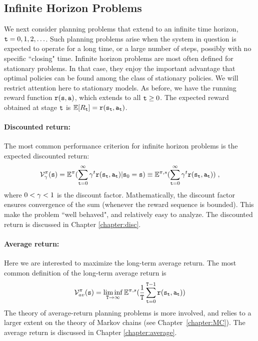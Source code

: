 \subsection{Infinite Horizon Problems}
We next consider planning problems that extend to an infinite time
horizon, ${\tt t} = 0,1,2, \ldots $. Such planning problems arise
when the system in question is expected to operate for a long time,
or a large number of steps, possibly with no specific ``closing"
time. Infinite horizon problems are most often defined for
stationary problems. In that case, they enjoy the important
advantage that optimal policies can be found among the class of
stationary policies.  We will restrict attention here to stationary
models. As before, we have the running reward function
${\tt r}({\tt s},{\tt a})$, which extends to all ${\tt t}\ge 0$. The
expected reward obtained at stage ${\tt t}$ is $\mathbb{E}[{R_{\tt t}}] =
{\tt r}({{\tt s}_{\tt t}},{{\tt a}_{\tt t}})$.

\paragraph{Discounted return:} The most common performance criterion for infinite horizon problems is the expected discounted return:
\[\mathcal{V}_\gamma ^\pi ({\tt s}) = {\mathbb{E}^\pi }(\sum\limits_{{\tt t} = 0}^\infty  {{\gamma^t}{\tt r}({{\tt s}_{\tt t}},{{\tt a}_{\tt t}})} |{{\tt s}_0} = {\tt s}) \equiv {\ensuremath{\mathbb{E}}^{\pi,s}}(\sum\limits_{{\tt t} = 0}^\infty  {{\gamma^t}{\tt r}({{\tt s}_{\tt t}},{{\tt a}_{\tt t}})} )\;,\]
where $0 < \gamma  < 1$ is the discount factor. Mathematically,
the discount factor ensures convergence of the sum (whenever the
reward sequence is bounded). This make the problem ``well behaved",
and relatively easy to analyze. The discounted return is discussed
in Chapter \ref{chapter:disc}.

\paragraph{Average return:}  Here we are interested to maximize the long-term average return. The most common definition of the long-term average return is
\[\mathcal{V}_{av}^\pi ({\tt s}) = \mathop {\lim \inf }\limits_{{\tt T} \to \infty } {\mathbb{E}^{\pi ,s}}(\frac{1}{{\tt T}}\sum\limits_{{\tt t} = 0}^{{\tt T} -1} {{\tt r}({{\tt s}_{\tt t}},{{\tt a}_{\tt t}})} )\]
The theory of average-return planning problems is more involved, and
relies to a larger extent on the theory of Markov chains (see
Chapter~\ref{chapter:MC}). The average return is discussed in
Chapter \ref{chapter:average}.



